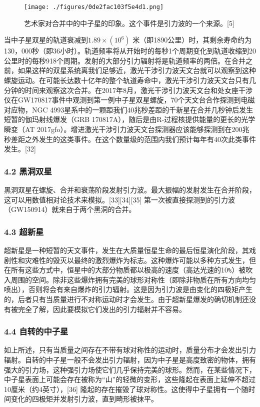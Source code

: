 \begin{figure}[ht]
\centering
\texttt{[image: ./figures/0de2fac103f5e4d1.png]}
\caption{艺术家对合并中的中子星的印象。这个事件是引力波的一个来源。[5]} \label{fig_YLB_7}
\end{figure}

当中子星双星的轨道衰减到$1.89\times(10^6)$ 米（即1890公里）时，其剩余寿命约为130，000秒（即36小时）。轨道频率将从开始时的每秒1个周期变化到轨道收缩到20公里时的每秒918个周期。发射的大部分引力辐射将是轨道频率的两倍。在合并之前，如果这样的双星系统离我们足够近，激光干涉引力波天文台就可以观察到这种螺旋运动。在可能长达数十亿年的整个轨道寿命中，激光干涉引力波天文台只有几分钟的时间来观察这次合并。在2017年8月，激光干涉引力波天文台和处女座干涉仪在GW170817事件中观测到第一例中子星双星螺旋，70个天文台合作探测到电磁对应物，NGC 4993星系中的一颗距我们40兆秒差距的千新星在合并几秒钟后发生短暂的伽玛射线爆发（GRB 170817A），随后是由R-过程核提供能量的更长的光学瞬变（AT 2017gfo）。增进激光干涉引力波天文台探测器应该能够探测到在200兆秒差距之外发生的这类事件。在这个数量级的范围内我们预计每年有40次此类事件发生。[32]
\subsubsection{4.2 黑洞双星}

黑洞双星在螺旋、合并和衰荡阶段发射引力波。最大振幅的发射发生在合并阶段，这可以用数值相对论技术来模拟。[33][34][35] 第一次被直接探测到的引力波（GW150914）就来自于两个黑洞的合并。

\subsubsection{4.3 超新星}

超新星是一种短暂的天文事件，发生在大质量恒星生命的最后恒星演化阶段，其戏剧性和灾难性的毁灭以最终的激烈爆炸为标志。这种爆炸可能以多种方式发生，但在所有这些方式中，恒星中的大部分物质都以极高的速度（高达光速的10\verb|%|）被吹入周围的空间。除非这些爆炸拥有完美的球形对称性（即除非物质在所有方向均匀喷出），否则将会有来自爆炸的引力辐射。这是因为引力波是由变化的四极矩产生的，后者只有当质量进行不对称运动时才会发生。由于超新星爆发的确切机制还没有被完全了解，因此要模拟它们发出的引力辐射并不容易。

\subsubsection{4.4 自转的中子星}

如上所述，只有当质量之间存在不带有球对称性的运动时，质量分布才会发出引力辐射。自转的中子星一般不会发出引力辐射，因为中子星是高度致密的物体，拥有强大的引力场，这种强引力场使它们几乎保持完美的球形。然而，在某些情况下，中子星表面上可能会存在被称为“山”的轻微的变形，这些隆起在表面上延伸不超过10厘米（约4英寸），[36] 隆起的存在摧毁了球对称性。这使得中子星拥有一个随时间变化的四极矩并发射引力波，直到畸形被抹平。

